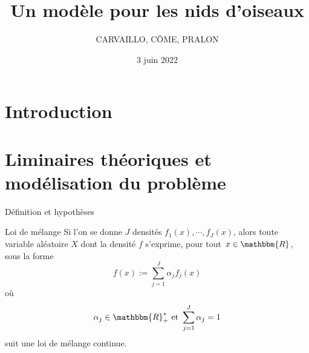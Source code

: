 \documentclass[11pt]{beamer}
\begin{document}
	\author{CARVAILLO, CÔME, PRALON}
	\title[Projet UE HAX817X]{Un modèle pour les nids d'oiseaux}
	\subtitle{}
	\date{3 juin 2022}
	\frame{\titlepage}
	
	\section{Introduction}
	
	
	\section{Liminaires théoriques et modélisation du problème}
	
	\begin{frame}{Définition et hypothèses}
		\begin{block}{Loi de mélange}
			Si l'on se donne $J$  densités $f_1(x), \cdots, f_J(x)$, alors toute variable aléatoire $X$ dont la densité $f$ s'exprime, pour tout $x\in\mathbbm{R}$, sous la forme
			\[
			f(x) := \displaystyle\sum_{j=1}^J \alpha_j f_j(x)
			\]
			où
			\[
			\alpha_j \in\mathbbm{R}_+^* \text{ et } \displaystyle\sum_{j=1}^J\alpha_j=1
			\]
			suit une loi de mélange continue.
		\end{block}
	\end{frame}
	
\end{document}
